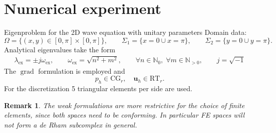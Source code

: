 \documentclass[aspectratio=169]{beamer}
\DeclareMathOperator*{\grad}{grad}
\newtheorem{remark}{Remark}
\begin{document}
\section{Numerical experiment}

\begin{frame}{Eigenproblem for the 2D wave equation with unitary parameters}
	Domain data:
	\begin{equation*}
		\Omega = \{(x,y) \in [0, \pi] \times [0, \pi]\},\qquad 
		\Sigma_1= \{x=0 \cup x=\pi\}, \qquad \Sigma_2 = \{y=0 \cup y=\pi\}.
	\end{equation*}
	Analytical eigenvalues take the form
	\begin{equation*}
		\begin{aligned}
			\lambda_{\mathrm{ex}}=\pm j \omega_{\mathrm{ex}}, \qquad 	\omega_{\mathrm{ex}} = \sqrt{n^2 + m^2},\qquad  \forall n \in \mathbb{N}_{0}, \; \forall m \in \mathbb{N}_{>0}, \qquad j=\sqrt{-1}
		\end{aligned}
	\end{equation*}
The $\grad$ formulation is employed and 
\begin{equation*}
		p_h \in \mathrm{CG}_r, \quad \bm{u}_h \in \mathrm{RT}_r.
\end{equation*}
 For the discretization 5 triangular elements per side are used.

 
\begin{remark}
	The weak formulations are more restrictive for the choice of  finite elements,  since both spaces need to be conforming. In particular FE spaces will not form a de Rham subcomplex in general.
\end{remark}

\end{frame}
\end{document}
